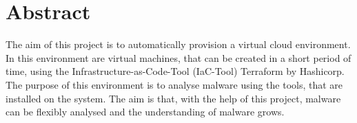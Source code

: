 \section*{Abstract}
The aim of this project is to automatically provision a virtual cloud environment. In this environment are virtual machines, that can be created in a short period of time, using the Infrastructure-as-Code-Tool (IaC-Tool) Terraform by Hashicorp. The purpose of this environment is to analyse malware using the tools, that are installed on the system. The aim is that, with the help of this project, malware can be flexibly analysed and the understanding of malware grows.